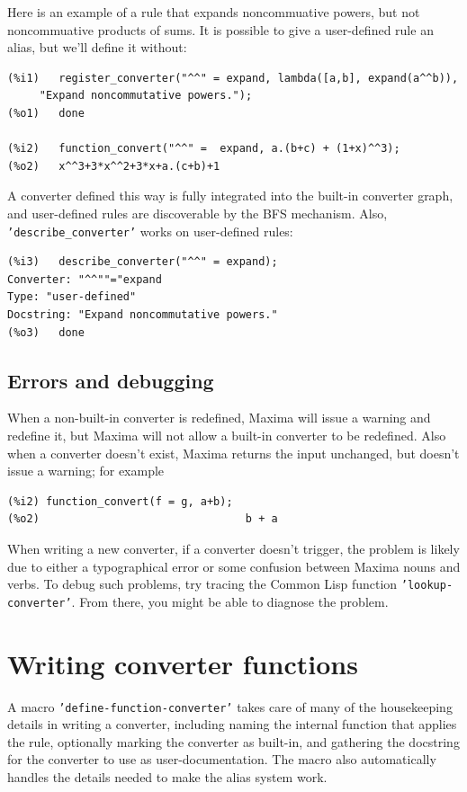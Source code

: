 \documentclass[12pt,fleqn]{extarticle}
\newcommand{\ttq}[1]{\texttt{'#1'}}
\newenvironment{maximabox}
  {\begin{tcolorbox}[
      breakable,
      enhanced,
      colback=white,
      colframe=black!8,
      boxrule=0pt,
      borderline west={2.2pt}{0pt}{black!25},
      arc=1pt,
      left=11pt,
      right=7pt,
      top=9pt,
      bottom=9pt,
      before skip=14pt,
      after skip=14pt
    ]}
  {\end{tcolorbox}}
\begin{document}
Here is an example of a rule that expands noncommuative powers, but not noncommuative products
of sums. It is possible to give a user-defined rule an alias, but we'll define it without:
\begin{maximabox}
\begin{verbatim}
(%i1)	register_converter("^^" = expand, lambda([a,b], expand(a^^b)), 
     "Expand noncommutative powers.");
(%o1)	done

(%i2)	function_convert("^^" =  expand, a.(b+c) + (1+x)^^3);
(%o2)	x^^3+3*x^^2+3*x+a.(c+b)+1
\end{verbatim}
\end{maximabox}
\noindent A converter defined this way is fully integrated into the built-in converter graph, and user-defined rules are discoverable by the BFS mechanism.  Also, \ttq{describe\_converter} works on 
user-defined rules:
\begin{maximabox}
\begin{verbatim}
(%i3)	describe_converter("^^" = expand);
Converter: "^^""="expand
Type: "user-defined"
Docstring: "Expand noncommutative powers."
(%o3)	done
\end{verbatim}
\end{maximabox}

\subsection{Errors and debugging}

When a non-built-in converter is redefined, Maxima will issue a warning and redefine it, but
Maxima will not allow a built-in converter to be redefined.  Also when a converter
doesn't exist,  Maxima returns the input unchanged, but doesn't issue a warning; 
for example
\begin{maximabox}
\begin{verbatim}
(%i2) function_convert(f = g, a+b);
(%o2)                                b + a
\end{verbatim}
\end{maximabox}

When writing a new converter, if a converter doesn't trigger, the problem is likely due to either
a typographical error or some confusion between Maxima nouns and verbs.  To debug such
problems, try tracing the Common Lisp function \ttq{lookup-converter}. From there, you 
might be able to diagnose the problem.

\section{Writing converter functions}
A macro \ttq{define-function-converter} takes care of many of the housekeeping 
details in writing a converter, including naming the internal function that applies the rule, 
optionally marking the converter as built-in, and gathering the docstring 
for the converter to use as user-documentation. The macro also automatically handles 
the details needed to make the alias system work. 
\end{document}
